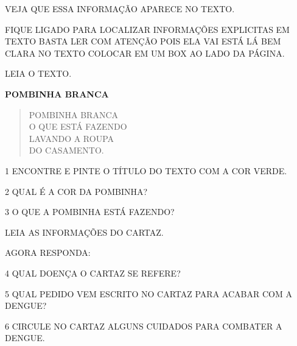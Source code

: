 \begin{escola}
{VEJA QUE ESSA INFORMAÇÃO APARECE NO TEXTO.

FIQUE LIGADO PARA LOCALIZAR INFORMAÇÕES EXPLICITAS EM TEXTO BASTA LER COM
ATENÇÃO POIS ELA VAI ESTÁ LÁ BEM CLARA NO TEXTO COLOCAR EM UM BOX AO
LADO DA PÁGINA.
}




LEIA O TEXTO.

\textbf{POMBINHA BRANCA}

\begin{verse}
POMBINHA BRANCA\\
O QUE ESTÁ FAZENDO\\
LAVANDO A ROUPA\\
DO CASAMENTO.
\end{verse}



\num{1} ENCONTRE E PINTE O TÍTULO DO TEXTO COM A COR VERDE.

\num{2} QUAL É A COR DA POMBINHA?


\num{3} O QUE A POMBINHA ESTÁ FAZENDO?


LEIA AS INFORMAÇÕES DO CARTAZ.


AGORA RESPONDA:

\num{4} QUAL DOENÇA O CARTAZ SE REFERE?


\num{5} QUAL PEDIDO VEM ESCRITO NO CARTAZ PARA ACABAR COM A DENGUE?


\num{6} CIRCULE NO CARTAZ ALGUNS CUIDADOS PARA COMBATER A DENGUE.


\end{escola}
